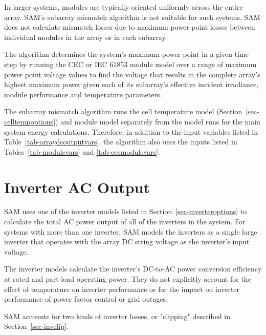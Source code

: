 \documentclass[12pt,letterpaper]{article}
\begin{document}
In larger systems, modules are typically oriented uniformly across the entire array. SAM's subarray mismatch algorithm is not suitable for such systems. SAM does not calculate mismatch losses due to maximum power point losses between individual modules in the array or in each subarray.

The algorithm determines the system's maximum power point in a given time step by running the CEC or IEC 61853 module model over a range of maximum power point voltage values to find the voltage that results in the complete array's highest maximum power given each of its subarray's effective incident irradiance, module performance and temperature parameters.

The subarray mismatch algorithm runs the cell temperature model (Section~\ref{sec-celltempoptions}) and module model separately from the model runs for the main system energy calculations. Therefore, in addition to the input variables listed in Table~\ref{tab-arraydcoutputvars}, the algorithm also uses the inputs listed in Tables~\ref{tab-modulevars} and \ref{tab-cecmodulevars}.

\chapter{Inverter AC Output}\label{sec-inverter}

SAM uses one of the inverter models listed in Section~\ref{sec-inverteroptions} to calculate the total AC power output of all of the inverters in the system. For systems with more than one inverter, SAM models the inverters as a single large inverter that operates with the array DC string voltage as the inverter's input voltage. 

The inverter models calculate the inverter's DC-to-AC power conversion efficiency at rated and part-load operating power. They do not explicitly account for the effect of temperature on inverter performance or for the impact on inverter performance of power factor control or grid outages. 

SAM accounts for two kinds of inverter losses, or "clipping" described in Section~\ref{sec-invclip}.
\end{document}
